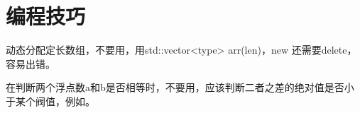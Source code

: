 \chapter{编程技巧}

动态分配定长数组，不要用，用std::vector<type> arr(len)，new 还需要delete，容易出错。

在判断两个浮点数a和b是否相等时，不要用，应该判断二者之差的绝对值是否小于某个阀值，例如。

